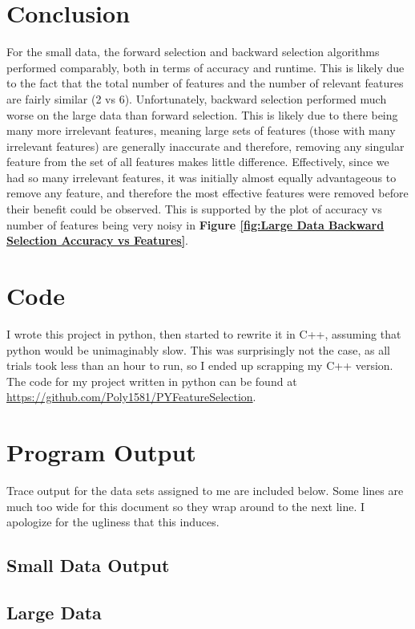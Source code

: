 \documentclass{article}
\begin{document}
\section{Conclusion}
For the small data, the forward selection and backward selection algorithms performed comparably, both in terms of accuracy and runtime. This is likely due to the fact that the total number of features and the number of relevant features are fairly similar (2 vs 6). Unfortunately, backward selection performed much worse on the large data than forward selection. This is likely due to there being many more irrelevant features, meaning large sets of features (those with many irrelevant features) are generally inaccurate and therefore, removing any singular feature from the set of all features makes little difference. Effectively, since we had so many irrelevant features, it was initially almost equally advantageous to remove any feature, and therefore the most effective features were removed before their benefit could be observed. This is supported by the plot of accuracy vs number of features being very noisy in \textbf{Figure \ref{fig:Large Data Backward Selection Accuracy vs Features}}.
\section{Code}
I wrote this project in python, then started to rewrite it in C++, assuming that python would be unimaginably slow. This was surprisingly not the case, as all trials took less than an hour to run, so I ended up scrapping my C++ version. The code for my project written in python can be found at \url{https://github.com/Poly1581/PYFeatureSelection}.
\pagebreak
\section{Program Output}
Trace output for the data sets assigned to me are included below. Some lines are much too wide for this document so they wrap around to the next line. I apologize for the ugliness that this induces.
\subsection{Small Data Output}

\pagebreak
\subsection{Large Data}

\end{document}
